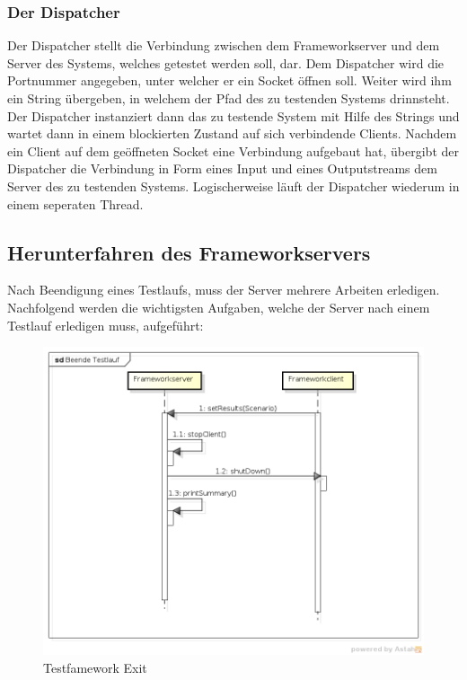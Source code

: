 \subsubsection{Der Dispatcher}
\label{sec:dispatcher}

Der Dispatcher stellt die Verbindung zwischen dem Frameworkserver und dem Server des Systems, welches getestet werden soll, dar. Dem Dispatcher wird die Portnummer angegeben, unter welcher er ein Socket öffnen soll. Weiter wird ihm ein String übergeben, in welchem der Pfad des zu testenden Systems drinnsteht. Der Dispatcher instanziert dann das zu testende System mit Hilfe des Strings und wartet dann in einem blockierten Zustand auf sich verbindende Clients. Nachdem ein Client auf dem geöffneten Socket eine Verbindung aufgebaut hat, übergibt der Dispatcher die Verbindung in Form eines Input und eines Outputstreams dem Server des zu testenden Systems.\newline
Logischerweise läuft der Dispatcher wiederum in einem seperaten Thread.

\subsection{Herunterfahren des Frameworkservers}
\label{sec:herunterfahrenFramework}

Nach Beendigung eines Testlaufs, muss der Server mehrere Arbeiten erledigen. Nachfolgend werden die wichtigsten Aufgaben, welche der Server nach einem Testlauf erledigen muss, aufgeführt:


\begin{figure}
\begin{center}
\includegraphics[scale=0.2]{image_testFramework/BeendeTestlauf.png}
\end{center}
\caption{Testfamework Exit}
\end{figure}

